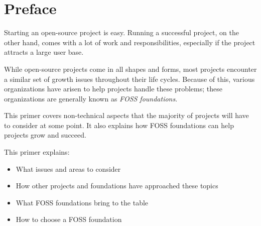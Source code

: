 


\chapter*{Preface}

Starting an open-source project is easy.  Running a successful project, on the other hand, comes with a lot of work and responsibilities, especially if the project attracts a large user base.

While open-source projects come in all shapes and forms, most projects encounter a similar set of growth issues throughout their life cycles.  Because of this, various organizations have arisen to help projects handle these problems; these organizations are generally known as \textit{FOSS foundations}.

This primer covers non-technical aspects that the majority of projects will have to consider at some point.  It also explains how FOSS foundations can help projects grow and succeed.

This primer explains:

\begin{itemize}

\item What issues and areas to consider

\item How other projects and foundations have approached these topics

\item What FOSS foundations bring to the table

\item How to choose a FOSS foundation

\end{itemize}

